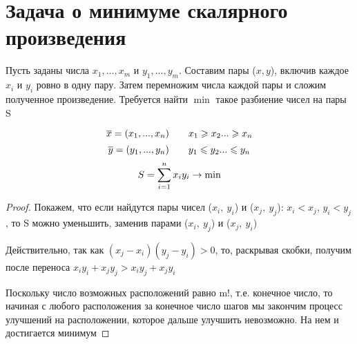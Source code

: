 \documentclass[discrete.tex]{subfiles}
\begin{document}
  \section{Задача о минимуме скалярного произведения}
  
  Пусть заданы числа $x_1,...,x_m$ и $y_1,...,y_m$. Составим пары ($x,y$), включив каждое $x_i$ и $y_i$ ровно в одну пару. Затем перемножим числа каждой пары и сложим полученное произведение. Требуется найти $\min$ такое разбиение чисел на пары S
  \begin{Theorem}
    \[\overline{x} = (x_1,...,x_n) \qquad x_1 \geqslant x_2 ... \geqslant x_n\]
    \[\overline{y} = (y_1,...,y_n) \qquad y_1 \leqslant y_2 ... \leqslant y_n\]
    \[S = \sum_{i=1}^n x_i y_i \rightarrow \min\]
  \end{Theorem}

  \begin{proof}
    Покажем, что если найдутся пары чисел ($x_i,\ y_i$) и ($x_j,\ y_j$): $x_i < x_j$, $y_i < y_j$, то S можно уменьшить, заменив парами ($x_i,\ y_j$) и ($x_j,\ y_i$)

    Действительно, так как $(x_j-x_i)(y_j-y_i)>0$, то, раскрывая скобки, получим после переноса $x_i y_i + x_j y_j > x_i y_j + x_j y_i$

    Поскольку число возможных расположений равно m!, т.е. конечное число, то начиная с любого расположения за конечное число шагов мы закончим процесс улучшений на расположении, которое дальше улучшить невозможно. На нем и достигается минимум
  \end{proof}
\end{document}
